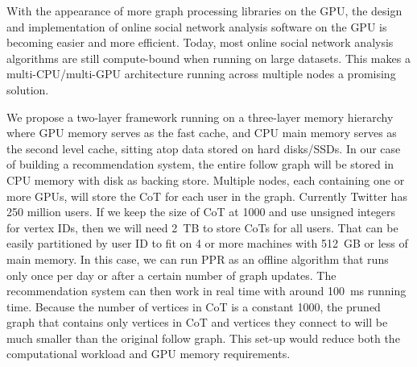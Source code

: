 \documentclass{article}
\begin{document}
With the appearance of more graph processing libraries on the GPU, the
design and implementation of online social network analysis software on the
GPU is becoming easier and more efficient. Today, most online social
network analysis algorithms are still compute-bound when running on large
datasets. This makes a multi-CPU/multi-GPU architecture running across
multiple nodes a promising solution.

We propose a two-layer framework running on a three-layer memory hierarchy
where GPU memory serves as the fast cache, and CPU main memory serves as
the second level cache, sitting atop data stored on hard disks/SSDs. In our
case of building a recommendation system, the entire follow graph will be
stored in CPU memory with disk as backing store. Multiple nodes, each
containing one or more GPUs, will store the CoT for each user in the graph.
Currently Twitter has 250 million users. If we keep the size of CoT at 1000
and use unsigned integers for vertex IDs, then we will need 2~TB to store
CoTs for all users. That can be easily partitioned by user ID to fit on 4
or more machines with 512~GB or less of main memory. In this case, we can
run PPR as an offline algorithm that runs only once per day or after a
certain number of graph updates. The recommendation system can then work in
real time with around 100~ms running time. Because the number of vertices
in CoT is a constant 1000, the pruned graph that contains only vertices in
CoT and vertices they connect to will be much smaller than the original
follow graph. This set-up would reduce both the computational workload and
GPU memory requirements.
\end{document}
